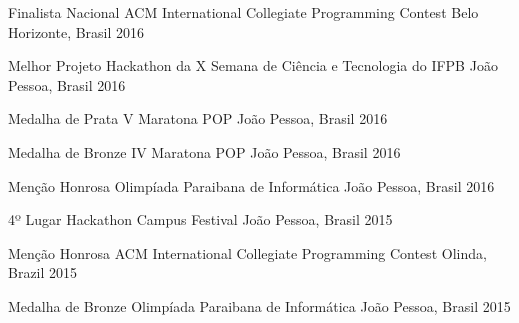 



\begin{cvhonors}
  
  \cvhonor
    {Finalista Nacional} %
    {ACM International Collegiate Programming Contest} %
    {Belo Horizonte, Brasil} %
    {2016} %
  
  \cvhonor
    {Melhor Projeto} %
    {Hackathon da X Semana de Ciência e Tecnologia do IFPB} %
    {João Pessoa, Brasil} %
    {2016} %
  
  \cvhonor
    {Medalha de Prata} %
    {V Maratona POP} %
    {João Pessoa, Brasil} %
    {2016} %
  
  \cvhonor
    {Medalha de Bronze} %
    {IV Maratona POP} %
    {João Pessoa, Brasil} %
    {2016} %
  
  \cvhonor
    {Menção Honrosa} %
    {Olimpíada Paraibana de Informática} %
    {João Pessoa, Brasil} %
    {2016} %
  
  \cvhonor
    {4º Lugar} %
    {Hackathon Campus Festival} %
    {João Pessoa, Brasil} %
    {2015} %
  
  \cvhonor
    {Menção Honrosa} %
    {ACM International Collegiate Programming Contest} %
    {Olinda, Brazil} %
    {2015} %
  
  \cvhonor
    {Medalha de Bronze} %
    {Olimpíada Paraibana de Informática} %
    {João Pessoa, Brasil} %
    {2015} %
  

\end{cvhonors}

